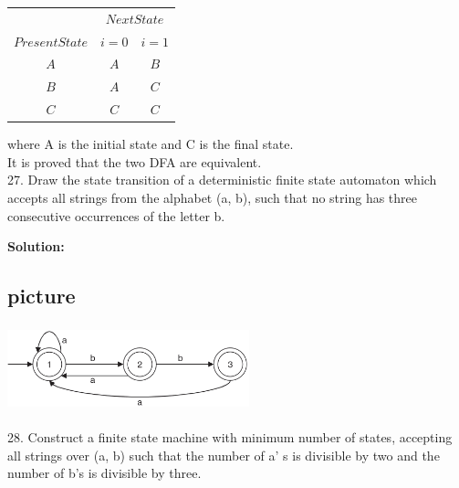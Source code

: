 \vspace*{0.2cm}
\begin{center}
	\begin{tabular}{ccc}
		\hline
		
		\hline
		
		\hline
		
		\hline
		& \multicolumn{2}{c}{$Next State$}\\
		\cline{2-3}
		$Present State$ &  $i=0$ & $i=1$\\
		\hline
		$A$   &   $A$      &  $B$ \\
		$B$   &   $A$      &  $C$   \\
		$C$   &   $C$      &  $C$   \\
		\hline
		
		\hline
		
		\hline
		
		\hline
	\end{tabular}
\end{center}

\vspace*{0.2cm}
where A is the initial state and C is the final state.\\
\hspace*{0.5cm} It is proved that the two DFA are equivalent.\\

27. Draw the state transition of a deterministic finite state automaton which accepts all strings from
the alphabet (a, b), such that no string has three consecutive occurrences of the letter b.\\
\begin{flushright}
	[GATE 1993]
\end{flushright}


\textbf{Solution:}\\

\begin{center}
	\section{picture}
	\includegraphics[width=7cm,height=2.5cm]{./content/chapter03/pictures/118.png}
\end{center}


28. Construct a finite state machine with minimum number of states, accepting all strings over (a, b)
such that the number of a' s is divisible by two and the number of b's is divisible by three.\\
\begin{flushright}
	[GATE 1997]
\end{flushright}



